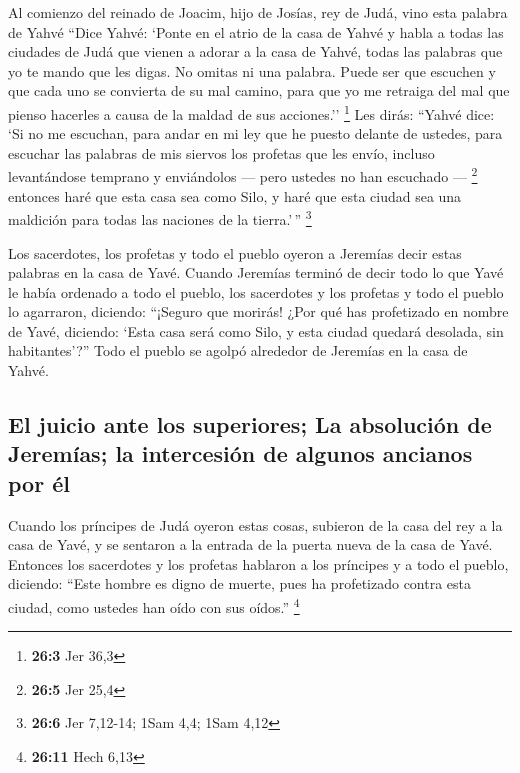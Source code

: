 \begin{paracol}{2}
 Al comienzo del reinado de Joacim, hijo de Josías, rey de
Judá, vino esta palabra de Yahvé  ``Dice Yahvé: `Ponte en
el atrio de la casa de Yahvé y habla a todas las ciudades de Judá que
vienen a adorar a la casa de Yahvé, todas las palabras que yo te mando
que les digas. No omitas ni una palabra.  Puede ser que
escuchen y que cada uno se convierta de su mal camino, para que yo me
retraiga del mal que pienso hacerles a causa de la maldad de sus
acciones.'' \footnote{\textbf{26:3} Jer 36,3}  Les dirás:
``Yahvé dice: `Si no me escuchan, para andar en mi ley que he puesto
delante de ustedes,  para escuchar las palabras de mis
siervos los profetas que les envío, incluso levantándose temprano y
enviándolos --- pero ustedes no han escuchado --- \footnote{\textbf{26:5}
  Jer 25,4}  entonces haré que esta casa sea como Silo, y
haré que esta ciudad sea una maldición para todas las naciones de la
tierra.'\,'' \footnote{\textbf{26:6} Jer 7,12-14; 1Sam 4,4; 1Sam 4,12}

 Los sacerdotes, los profetas y todo el pueblo oyeron a
Jeremías decir estas palabras en la casa de Yavé.  Cuando
Jeremías terminó de decir todo lo que Yavé le había ordenado a todo el
pueblo, los sacerdotes y los profetas y todo el pueblo lo agarraron,
diciendo: ``¡Seguro que morirás!  ¿Por qué has profetizado
en nombre de Yavé, diciendo: `Esta casa será como Silo, y esta ciudad
quedará desolada, sin habitantes'?'' Todo el pueblo se agolpó alrededor
de Jeremías en la casa de Yahvé.

\hypertarget{el-juicio-ante-los-superiores-la-absoluciuxf3n-de-jeremuxedas-la-intercesiuxf3n-de-algunos-ancianos-por-uxe9l}{%
\subsection{El juicio ante los superiores; La absolución de Jeremías; la
intercesión de algunos ancianos por
él}\label{el-juicio-ante-los-superiores-la-absoluciuxf3n-de-jeremuxedas-la-intercesiuxf3n-de-algunos-ancianos-por-uxe9l}}

 Cuando los príncipes de Judá oyeron estas cosas,
subieron de la casa del rey a la casa de Yavé, y se sentaron a la
entrada de la puerta nueva de la casa de Yavé.  Entonces
los sacerdotes y los profetas hablaron a los príncipes y a todo el
pueblo, diciendo: ``Este hombre es digno de muerte, pues ha profetizado
contra esta ciudad, como ustedes han oído con sus oídos.'' \footnote{\textbf{26:11}
  Hech 6,13}


\end{paracol}
